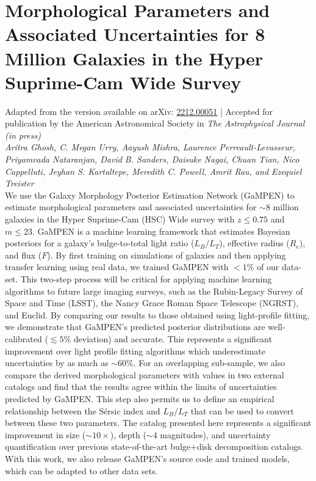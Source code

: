 \chapter{Morphological Parameters and Associated Uncertainties for 8 Million Galaxies in the Hyper Suprime-Cam Wide Survey} \label{chap:hsc_morph}

Adapted from the version available on arXiv: \href{https://arxiv.org/abs/2212.00051}{2212.00051} | Accepted for publication by the American Astronomical Society in \textit{The Astrophysical Journal (in press)} \\
{\large \emph{Aritra Ghosh, C. Megan Urry, Aayush Mishra, Laurence Perreault-Levasseur, Priyamvada Nataranjan, David B. Sanders, Daisuke Nagai, Chuan Tian, Nico Cappelluti, Jeyhan S. Kartaltepe, Meredith C. Powell, Amrit Rau, and Ezequiel Treister}}\\


We use the Galaxy Morphology Posterior Estimation Network (GaMPEN) to estimate morphological parameters and associated uncertainties for $\sim 8$ million galaxies in the Hyper Suprime-Cam (HSC) Wide survey with $z \leq 0.75$ and $m \leq 23$. GaMPEN is a machine learning framework that estimates Bayesian posteriors for a galaxy's bulge-to-total light ratio ($L_B/L_T$), effective radius ($R_e$), and flux ($F$). By first training on simulations of galaxies and then applying transfer learning using real data, we trained GaMPEN with $<1\%$ of our data-set. This two-step process will be critical for applying machine learning algorithms to future large imaging surveys, such as the Rubin-Legacy 
Survey of Space and Time (LSST), the Nancy Grace Roman Space Telescope (NGRST), and Euclid. By comparing our results to those obtained using light-profile fitting, we demonstrate that GaMPEN's predicted posterior distributions are well-calibrated ($\lesssim 5\%$ deviation) and accurate. This represents a significant improvement over light profile fitting algorithms which underestimate uncertainties by as much as $\sim60\%$. For an overlapping sub-sample, we also compare the derived morphological parameters with values in two external catalogs and find that the results agree within the limits of uncertainties predicted by GaMPEN. This step also permits us to define an empirical relationship between the S\'ersic index and $L_B/L_T$ that can be used to convert between these two parameters. The catalog presented here represents a significant improvement in size ($\sim10 \times $), depth ($\sim4$ magnitudes), and uncertainty quantification over previous state-of-the-art bulge+disk decomposition catalogs. With this work, we also release GaMPEN's source code and trained models, which can be adapted to other data sets.


